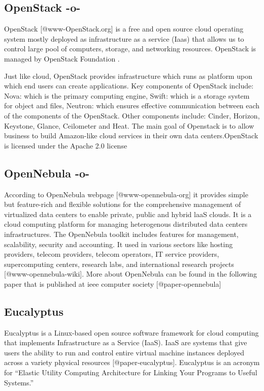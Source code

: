 \subsection{OpenStack -o-}
 
OpenStack [@www-OpenStack.org] is a free and open source cloud
operating system mostly deployed as infrastructure as a service (Iaas)
that allows us to control large pool of computers, storage, and
networking resources.  OpenStack is managed by OpenStack Foundation
\cite{www-OpenStack-Found}.
     
Just like cloud, OpenStack provides infrastructure which runs as
platform upon which end users can create applications. Key components
of OpenStack include: Nova: which is the primary computing engine,
Swift: which is a storage system for object and files, Neutron: which
ensures effective communication between each of the components of the
OpenStack. Other components include: Cinder, Horizon, Keystone,
Glance, Ceilometer and Heat. The main goal of Openstack is to allow
business to build Amazon-like cloud services in their own data
centers.OpenStack is licensed under the Apache 2.0 license
\cite{www-apache-license}
  
\subsection{OpenNebula -o-}

According to OpenNebula webpage [@www-opennebula-org] it provides
simple but feature-rich and flexible solutions for the comprehensive
management of virtualized data centers to enable private, public and
hybrid laaS clouds. It is a cloud computing platform for managing
heterogenous distributed data centers infrastructures. The OpenNebula
toolkit includes features for management, scalability, security and
accounting. It used in various sectors like hosting providers, telecom
providers, telecom operators, IT service providers, supercomputing
centers, research labs, and international research
projects [@www-opennebula-wiki]. More about OpenNebula can be
found in the following paper that is published at ieee computer
society [@paper-opennebula]
     
\subsection{Eucalyptus}

Eucalyptus is a Linux-based open source software framework for cloud
computing that implements Infrastructure as a Service (IaaS). IaaS are
systems that give users the ability to run and control entire virtual
machine instances deployed across a variety physical
resources [@paper-eucalyptus]. Eucalyptus is an acronym for
``Elastic Utility Computing Architecture for Linking Your Programs to
Useful Systems.''


